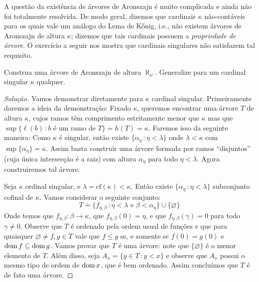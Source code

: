 \documentclass[a4paper]{article}
\begin{document}
 A questão da existência de árvores de Aronszajn é muito complicada e ainda não
 foi totalmente resolvida. De modo geral, dizemos que cardinais \(\kappa\)
 não-contáveis para os quais vale um  análogo do Lema de Kőnig, i.e., não
 existem árvores  de Aronszajn de altura \(\kappa\); dizemos que tais cardinais
 possuem a  \textit{propriedade de árvore}. O exercício a seguir nos mostra que
 cardinais singulares não satisfazem tal requisito.

 \begin{exercicio}
  Construa uma árvore de Aronszajn de altura \(\aleph_{\omega}\). Generalize
  para um cardinal singular \(\kappa\) qualquer.
\end{exercicio}
\begin{proof}[Solução]
Vamos demonstrar diretamente para \(\kappa\) cardinal singular.
 Primeiramente daremos a ideia da demonstração: Fixado \(\kappa\), queremos
 encontrar uma árvore \(T\) de altura \(\kappa\), cujos ramos têm comprimento
 estritamente  menor que \(\kappa\) mas que \(\sup \{\ell(b)\,\colon b\text{ é um ramo de
 }T\}=h(T)=\kappa\). Faremos isso da seguinte maneira: Como \(\kappa\) é singular,
 então existe \(\{\alpha_\eta\,\colon\eta<\lambda\}\) onde \(\lambda<\kappa\)
 com \mbox{\(\sup\{\alpha_\eta\}=\kappa\)}. Assim basta construir uma árvore formada
 por  ramos ``disjuntos''  (cuja única intersecção é a raiz) com altura
 \(\alpha_\eta\)  para todo \(\eta<\lambda\). Agora construiremos tal árvore.
 
 Seja \(\kappa\) ordinal singular, e \(\lambda=\text{cf}(\kappa)<\kappa\). Então existe
 \(\{\alpha_\eta\,\colon \eta<\lambda\}\) subconjunto cofinal de \(\kappa\).
 Vamos considerar o seguinte
 conjunto: \[T\doteq\big\{f_{\eta,\beta}\,\colon\eta<\lambda\text{ e
   }\beta<\alpha_{\eta}\}\cup\big\{\varnothing\big\}\]
   Onde temos que \(f_{\eta,\beta}\colon\beta\to\kappa\), que
   \(f_{\eta,\beta}(0)=\eta\), e que \(f_{\eta,\beta}(\gamma)=0\) para todo \(\gamma\neq0\). 
 Observe que \(T\) é ordenado pela ordem usual de funções e que para quaisquer
 \(\varnothing\neq f,g\in T\) vale que \(f\leq g\) se, e somente se  \(f(0)=g(0)\) e
 \(\operatorname{dom} f\subseteq\operatorname{dom} g\).
 Vamos provar que \(T\) é uma árvore: note que  \(\{\varnothing\}\) é o menor elemento de
 \(T\). Além disso, seja \mbox{\(A_x=\{y\in T\,\colon y<x\}\)} e observe que
 \(A_x\) possui o mesmo tipo de ordem de  \(\operatorname{dom} x\), que é bem ordenado. Assim
 concluímos que \(T\) é de fato uma árvore. 
 

\end{proof}
\end{document}
